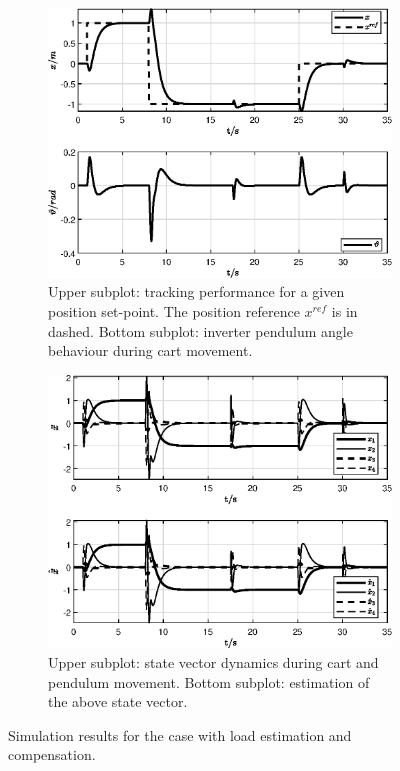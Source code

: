 \documentclass[11pt,a4paper,oneside]{book}
\numberwithin{equation}{section}
\theoremstyle{it}
\theoremstyle{definition}
\begin{document}
\begin{figure}[H]
	\centering
	\begin{subfigure}{1\textwidth}
		\centering
		\includegraphics[width = 320pt, angle = 0, 
		keepaspectratio]{figures/pendulum_on_cart/invpenoncart_sim_results_3.eps}
		\captionsetup{width=0.65\textwidth}
		\caption{Upper subplot: tracking performance for a given position set-point. The 
			position reference $x^{ref}$ is in dashed. Bottom subplot: inverter pendulum angle behaviour during cart movement. }
		\label{invpenoncart_sim_results_3}
	\end{subfigure}\vspace{5mm}
	\begin{subfigure}{1\textwidth}
		\centering
		\includegraphics[width = 320pt, angle = 0, 
		keepaspectratio]{figures/pendulum_on_cart/invpenoncart_sim_results_4.eps}
		\captionsetup{width=0.65\textwidth}
		\caption{Upper subplot: state vector dynamics during cart and pendulum movement. Bottom subplot: estimation of the above state vector.}
		\label{invpenoncart_sim_results_4}
	\end{subfigure}
	\captionsetup{width=0.65\textwidth}
	\caption{Simulation results for the case with load estimation and compensation.}
	\label{}
\end{figure}
\end{document}
